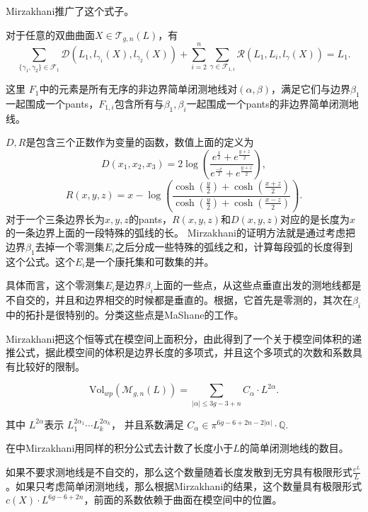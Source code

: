 Mirzakhani推广了这个式子。

\begin{thmb}
对于任意的双曲曲面$X\in \mathscr{T}_{g,n}(L)$，有$$
\sum_{\{\gamma_1,\gamma_2\}\in\mathscr{F}_1}\mathscr{D}(L_1,l_{\gamma_1}(X),l_{\gamma_2}(X))+\sum_{i=2}^n\sum_{\gamma\in \mathscr{F}_{1,i}}\mathscr{R}(L_1,L_i,l_{\gamma}(X))=L_1.
$$
\end{thmb}
这里 $F_1$中的元素是所有无序的非边界简单闭测地线对$(\alpha,\beta)$，满足它们与边界$\beta_1$一起围成一个pants，$F_{1,i}$包含所有与$\beta_1,\beta_i$一起围成一个pants的非边界简单闭测地线。

$D,R$是包含三个正数作为变量的函数，数值上面的定义为
\begin{equation*}\label{D}
  D(x_1,x_2,x_3)=2\log \left(\frac{e^{\frac{x}{2}}+e^{\frac{y+z}{2}}}{e^{\frac{-x}{2}}+e^{\frac{y+z}{2}}}\right),
  \end{equation*}
 \begin{equation*}\label{R}
     R(x,y,z)=x-\log \left(\frac{\cosh(\frac{y}{2})+\cosh (\frac{x+z}{2})}{\cosh(\frac{y}{2})+\cosh (\frac{x-z}{2})}\right).
 \end{equation*}
对于一个三条边界长为$x,y,z$的pants，$R(x,y,z)$和$D(x,y,z)$对应的是长度为$x$的一条边界上面的一段特殊的弧线的长。
Mirzakhani的证明方法就是通过考虑把边界$\beta_1$去掉一个零测集$E_i$之后分成一些特殊的弧线之和，计算每段弧的长度得到这个公式。这个$E_i$是一个康托集和可数集的并。


具体而言，这个零测集$E_i$是边界$\beta_i$上面的一些点，从这些点垂直出发的测地线都是不自交的，并且和边界相交的时候都是垂直的。根据\cite{BIRMAN1985217}，它首先是零测的，其次在$\beta_i$中的拓扑是很特别的。分类这些点是MaShane的工作\cite{McShane1998SimpleGA}。

Mirzakhani把这个恒等式在模空间上面积分，由此得到了一个关于模空间体积的递推公式，据此模空间的体积是边界长度的多项式，并且这个多项式的次数和系数具有比较好的限制。
\begin{thmb}
$$\mathrm{Vol}_{wp}(\mathscr{M}_{g,n}(L))=\sum_{|\alpha|\leq 3g-3+n}C_\alpha\cdot L^{2\alpha}.$$

其中 $L^{2\alpha}$表示 $L_1^{2\alpha_1}\cdots L_k^{2\alpha_k}$， 并且系数满足 $C_\alpha\in \pi^{6g-6+2n-2|\alpha|}\cdot \mathbb{Q}$.
\end{thmb}

在\cite{growthofsimple}中Mirzakhani用同样的积分公式去计数了长度小于$L$的简单闭测地线的数目。

如果不要求测地线是不自交的，那么这个数量随着长度发散到无穷具有极限形式$\frac{e^L}{L}$。如果只考虑简单闭测地线，那么根据Mirzakhani的结果，这个数量具有极限形式$c(X)\cdot L^{6g-6+2n}$，前面的系数依赖于曲面在模空间中的位置。

